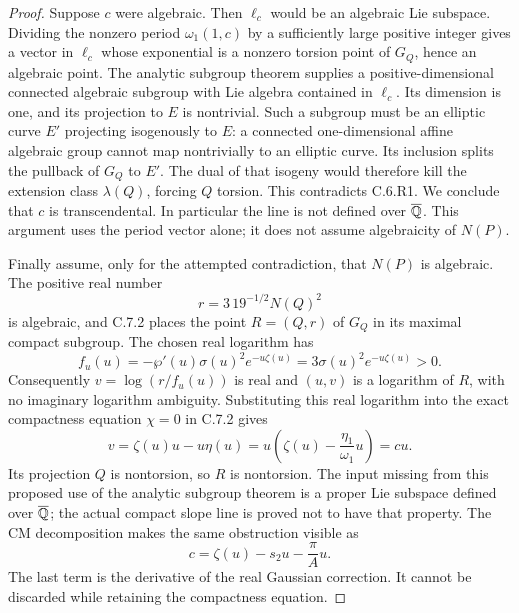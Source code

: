 \begin{proof}
Suppose $c$ were algebraic. Then $\ell_c$ would be an
algebraic Lie subspace. Dividing the nonzero period
$\omega_1(1,c)$ by a sufficiently large positive integer
gives a vector in $\ell_c$ whose exponential is a nonzero
torsion point of $G_Q$, hence an algebraic point. The
analytic subgroup theorem
\citep[Theorem 6.1]{huber2022} supplies a positive-dimensional
connected algebraic subgroup with Lie algebra contained in
$\ell_c$. Its dimension is one, and its projection to $E$
is nontrivial. Such a subgroup must be an elliptic curve
$E'$ projecting isogenously to $E$: a connected
one-dimensional affine algebraic group cannot map
nontrivially to an elliptic curve. Its inclusion splits the
pullback of $G_Q$ to $E'$. The dual of that isogeny would
therefore kill the extension class $\lambda(Q)$, forcing
$Q$ torsion. This contradicts C.6.R1. We conclude that $c$
is transcendental. In particular the line is not defined over
$\overline{\mathbb Q}$. This argument uses the period vector alone;
it does not assume algebraicity of $N(P)$.

Finally assume, only for the attempted contradiction, that
$N(P)$ is algebraic. The positive real number
\[
 r=3\,19^{-1/2}N(Q)^2
\]
is algebraic, and C.7.2 places the point $R=(Q,r)$ of
$G_Q$ in its maximal compact subgroup. The chosen real
logarithm has
\[
 f_u(u)=-\wp'(u)\sigma(u)^2e^{-u\zeta(u)}
        =3\sigma(u)^2e^{-u\zeta(u)}>0.
\]
Consequently $v=\log(r/f_u(u))$ is real and
$(u,v)$ is a logarithm of $R$, with no imaginary logarithm
ambiguity. Substituting this real logarithm into the exact
compactness equation $\chi=0$ in C.7.2 gives
\[
 v=\zeta(u)u-u\eta(u)
   =u\left(\zeta(u)-\frac{\eta_1}{\omega_1}u\right)=cu.
\]
Its projection $Q$ is nontorsion, so $R$ is nontorsion.
The input missing from this proposed use of the analytic
subgroup theorem is a proper Lie subspace defined over
$\overline{\mathbb Q}$; the actual compact slope line is proved
not to have that property. The CM decomposition makes the
same obstruction visible as
\[
 c=\zeta(u)-s_2u-\frac{\pi}{A}u.
\]
The last term is the derivative of the real Gaussian
correction. It cannot be discarded while retaining the
compactness equation.
\end{proof}


